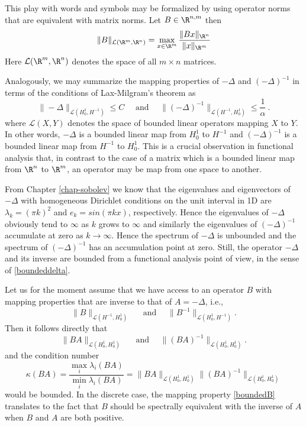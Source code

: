 This play with words and symbols may be formalized by using operator norms that
are equivalent with matrix norms. Let $B \in \R^{n,m}$ then
\[    
\|B\|_{\mathcal{L}(\R^m, \R^n)} = \max_{x\in\R^m} \frac{\Vert B x\Vert_{\R^n}}{\Vert x \Vert_{\R^m}}   
\]
Here $\mathcal{L}(\R^m, \R^n)$ denotes the space of all $m\times n$ matrices. 

Analogously, we may summarize the mapping properties of $-\Delta$ and  $(-\Delta)^{-1}$ 
in terms of the conditions of Lax-Milgram's theorem as  
\begin{equation} 
\label{boundeddelta}
\|-\Delta\|_{\mathcal{L}(H^1_0, H^{-1})} \le C
\quad \text{ and } \quad  
\|(-\Delta)^{-1}\|_{\mathcal{L}(H^{-1}, H^1_0) } \le \frac{1}{\alpha} \ . 
\end{equation}
where ${\mathcal{L}(X, Y)}$ denotes the space of bounded linear operators mapping
$X$ to $Y$.  
In other words, $-\Delta$ is a bounded linear map from
$H^1_0$ to $H^{-1}$ and 
$(-\Delta)^{-1}$ is a bounded linear map from
$H^{-1}$ to $H^1_0$. 
This is a crucial observation
in functional analysis that, in contrast to the case of  
a matrix which is  a bounded linear map from $\R^n$ to $\R^m$, 
an operator may be map from one space to another. 

From Chapter \ref{chap-sobolev} we know that the eigenvalues
and eigenvectors of $-\Delta$ with homogeneous Dirichlet
conditions on the unit interval in 1D are
$\lambda_k=(\pi k)^2$ and $e_k = sin(\pi k x)$, respectively. 
Hence the eigenvalues of $-\Delta$ obviously tend to $\infty$
as $k$ grows to $\infty$ and similarly the eigenvalues
of $(-\Delta)^{-1}$ accumulate at zero as $k\rightarrow \infty$.  
Hence the spectrum of $-\Delta$ is unbounded and the 
spectrum of $(-\Delta)^{-1}$ has an accumulation point at zero.  
Still, the operator $-\Delta$ and its inverse are bounded
from a functional analysis point of view, in the sense of 
\eqref{boundeddelta}.  


Let us for the moment assume that we have access to an operator $B$ with mapping
properties that are inverse to that of $A=-\Delta$, i.e., 
\begin{equation} 
\label{boundedB}
\|B\|_{\mathcal{L}(H^{-1}, H^1_0) } \  
\quad \text{ and } \quad  
\|B^{-1}\|_{\mathcal{L}(H^1_0, H^{-1})} . 
\end{equation}
Then it follows directly that 
\begin{equation} 
\label{boundeddelta}
\|B A\|_{\mathcal{L}(H^1_0, H^1_0) } \  
\quad \text{ and } \quad  
\|(B A)^{-1}\|_{\mathcal{L}(H^1_0, H^1_0)} . 
\end{equation}
and the condition number 
\[
\kappa(BA) = \frac{\max_i \lambda_i (BA)}{\min _i \lambda_i (BA)} =    \|B A\|_{\mathcal{L}(H^1_0, H^1_0) }   \|(B A)^{-1}\|_{\mathcal{L}(H^1_0, H^1_0)}
\]
would be bounded.  
In the discrete case, the mapping property \eqref{boundedB} translates to the fact that  $B$ should be spectrally equivalent with the inverse of $A$ 
when $B$ and $A$ are both positive.  

